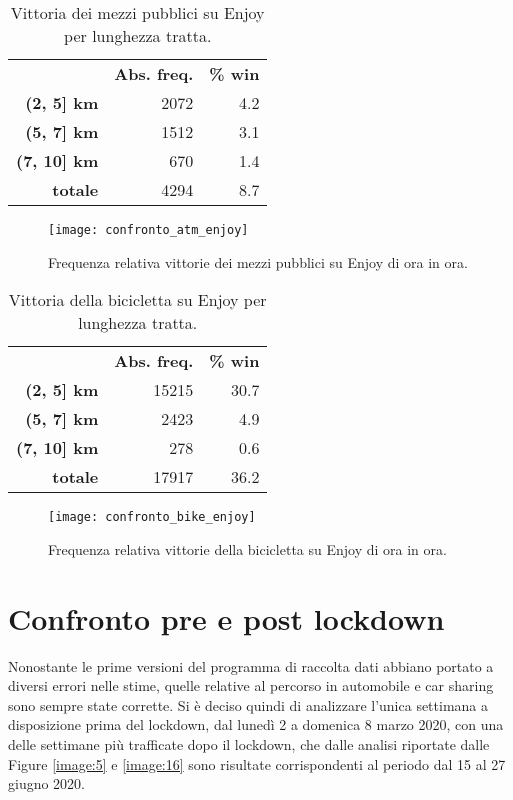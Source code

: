 \begin{table}[H]
	\centering
	\begin{tabular}{ | r r r | }
		\hline
		& \textbf{Abs. freq.} & \textbf{\% win} \\
		\textbf{(2, 5] km} & 2072 & 4.2 \\
		\textbf{(5, 7] km} & 1512 & 3.1 \\
		\textbf{(7, 10] km} & 670 & 1.4 \\
		\hline
		\textbf{totale} & 4294 & 8.7 \\
		\hline
	\end{tabular}
	\caption{Vittoria dei mezzi pubblici su Enjoy per lunghezza tratta.}
	\label{table:5}
\end{table}

\begin{figure}[H]
	\centering
	\texttt{[image: confronto\_atm\_enjoy]}
	\caption{Frequenza relativa vittorie dei mezzi pubblici su Enjoy di ora in ora.}
	\label{image:13}
\end{figure}

\pagebreak

\begin{table}[H]
	\centering
	\begin{tabular}{ | r r r | }
		\hline
		& \textbf{Abs. freq.} & \textbf{\% win} \\
		\textbf{(2, 5] km} & 15215 & 30.7 \\
		\textbf{(5, 7] km} & 2423 & 4.9 \\
		\textbf{(7, 10] km} & 278 & 0.6 \\
		\hline
		\textbf{totale} & 17917 & 36.2 \\
		\hline
	\end{tabular}
	\caption{Vittoria della bicicletta su Enjoy per lunghezza tratta.}
	\label{table:6}
\end{table}

\begin{figure}[H]
	\centering
	\texttt{[image: confronto\_bike\_enjoy]}
	\caption{Frequenza relativa vittorie della bicicletta su Enjoy di ora in ora.}
	\label{image:14}
\end{figure}

\pagebreak

\section{Confronto pre e post lockdown}

Nonostante le prime versioni del programma di raccolta dati abbiano portato a diversi errori nelle stime, quelle relative al percorso in automobile e car sharing sono sempre state corrette. Si è deciso quindi di analizzare l'unica settimana a disposizione prima del lockdown, dal lunedì 2 a domenica 8 marzo 2020, con una delle settimane più trafficate dopo il lockdown, che dalle analisi riportate dalle Figure \ref{image:5} e \ref{image:16} sono risultate corrispondenti al periodo dal 15 al 27 giugno 2020.


